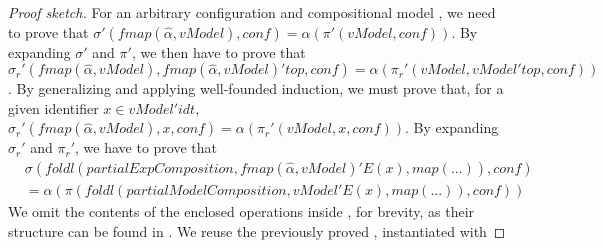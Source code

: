 \begin{proof}[Proof sketch]
 For an arbitrary configuration %
 and compositional model %
 , we need to prove that 
 $\mathit{\sigma'(fmap(\hat\alpha,vModel),conf)} = \mathit{\alpha(\pi'(vModel,conf))}$.
 By expanding %
 $\sigma'$ and %
 $\pi'$, we then have to prove that 
 $\mathit{\sigma_r'(fmap(\hat\alpha,vModel),fmap(\hat\alpha,vModel)'top,conf)} = \mathit{\alpha(\pi_r'(vModel,vModel'top,conf))}$.
By generalizing %
and applying well-founded induction, we must prove that, for a given identifier %
$x \in \mathit{vModel'idt}$,
$\mathit{\sigma_r'(fmap(\hat\alpha,vModel),x,conf)} = \mathit{\alpha(\pi_r'(vModel,x,conf))}$.
By expanding %
$\sigma_r'$
and %
$\pi_r'$, 
we have to prove that
\begin{equation*}
\begin{split}
& \mathit{\sigma(foldl(partialExpComposition,fmap(\hat\alpha,vModel)'E(x),map(...)),conf)}\\
& = \mathit{\alpha(\pi(foldl(partialModelComposition,vModel'E(x),map(...)),conf))}
\end{split}
\end{equation*}
We omit the contents of the enclosed %
 operations inside %
, for brevity, as their structure can be found in . 
We reuse the previously proved , %
instantiated with %

\end{proof}
